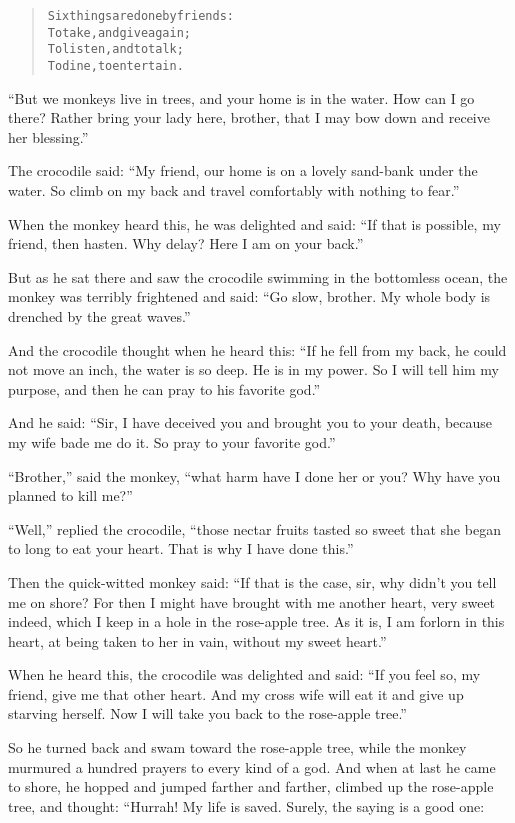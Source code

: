 \documentclass[article, twoside, 14pt]{memoir}
\renewenvironment{verbatim}{%
\begin{quote}%
\vskip -10pt%
\begin{alltt}\normalfont\large}{\end{alltt}%
\end{quote}%
\vskip -10pt
} %
\begin{document}
\begin{verbatim}
Six things are done by friends:
To take, and give again;
To listen, and to talk;
To dine, to entertain.
\end{verbatim}
``But we monkeys live in trees, and your home is in the water. How can I go there? Rather bring your lady here, brother, that I may bow down and receive her blessing.''

The crocodile said:
``My friend, our home is on a lovely sand-bank under the water. So climb on my back and travel comfortably with nothing to fear.''

When the monkey heard this, he was delighted and said:
``If that is possible, my friend, then hasten. Why delay? Here I am on your back.''

But as he sat there and saw the crocodile swimming in the
bottomless ocean, the monkey was terribly frightened and said:
``Go slow, brother. My whole body is drenched by the great waves.''

And the crocodile thought when he heard this:
``If he fell from my back, he could not move an inch, the water is so deep. He is in my power. So I will tell him my purpose, and then he can pray to his favorite god.''

And he said:
``Sir, I have deceived you and brought you to your death, because my wife bade me do it. So pray to your favorite god.''

``Brother,'' said the monkey,
``what harm have I done her or you? Why have you planned to kill me?''

``Well,'' replied the crocodile,
``those nectar fruits tasted so sweet that she began to long to eat your heart. That is why I have done this.''

Then the quick-witted monkey said:
``If that is the case, sir, why didn't you tell me on shore? For then I might have brought with me another heart, very sweet indeed, which I keep in a hole in the rose-apple tree. As it is, I am forlorn in this heart, at being taken to her in vain, without my sweet heart.''

When he heard this, the crocodile was delighted and said:
``If you feel so, my friend, give me that other heart. And my cross wife will eat it and give up starving herself. Now I will take you back to the rose-apple tree.''

So he turned back and swam toward the rose-apple tree, while the
monkey murmured a hundred prayers to every kind of a god. And when
at last he came to shore, he hopped and jumped farther and farther,
climbed up the rose-apple tree, and thought: “Hurrah! My life is
saved. Surely, the saying is a good one:
\end{document}
